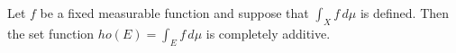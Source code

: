Let $f$ be a fixed measurable function and suppose that $\int_X f \, d\mu$ is defined. Then the set function $
ho(E) = \int_E f \, d\mu$ is completely additive.
